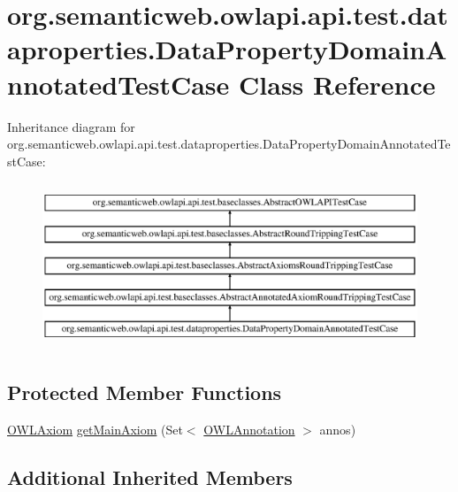 \hypertarget{classorg_1_1semanticweb_1_1owlapi_1_1api_1_1test_1_1dataproperties_1_1_data_property_domain_annotated_test_case}{\section{org.\-semanticweb.\-owlapi.\-api.\-test.\-dataproperties.\-Data\-Property\-Domain\-Annotated\-Test\-Case Class Reference}
\label{classorg_1_1semanticweb_1_1owlapi_1_1api_1_1test_1_1dataproperties_1_1_data_property_domain_annotated_test_case}
}
Inheritance diagram for org.\-semanticweb.\-owlapi.\-api.\-test.\-dataproperties.\-Data\-Property\-Domain\-Annotated\-Test\-Case\-:\begin{figure}[H]
\begin{center}
\leavevmode
\includegraphics[height=5.000000cm]{classorg_1_1semanticweb_1_1owlapi_1_1api_1_1test_1_1dataproperties_1_1_data_property_domain_annotated_test_case}
\end{center}
\end{figure}
\subsection*{Protected Member Functions}
\begin{DoxyCompactItemize}
\item 
\hyperlink{interfaceorg_1_1semanticweb_1_1owlapi_1_1model_1_1_o_w_l_axiom}{O\-W\-L\-Axiom} \hyperlink{classorg_1_1semanticweb_1_1owlapi_1_1api_1_1test_1_1dataproperties_1_1_data_property_domain_annotated_test_case_aabba05e379f13c80714e6fa7b8e660bf}{get\-Main\-Axiom} (Set$<$ \hyperlink{interfaceorg_1_1semanticweb_1_1owlapi_1_1model_1_1_o_w_l_annotation}{O\-W\-L\-Annotation} $>$ annos)
\end{DoxyCompactItemize}
\subsection*{Additional Inherited Members}


